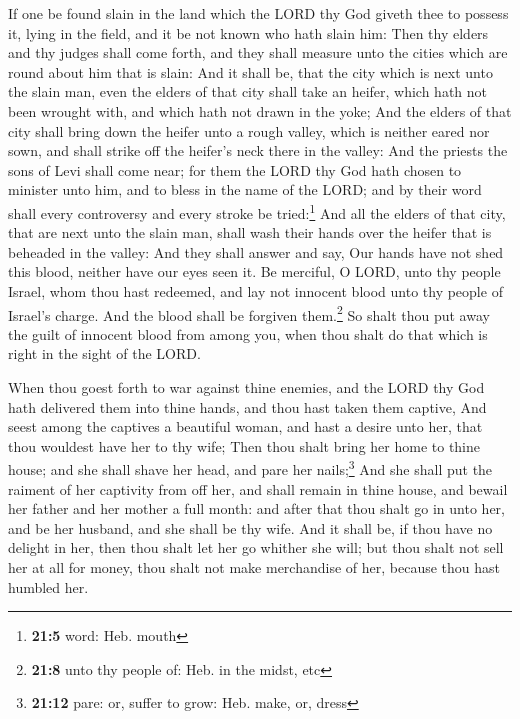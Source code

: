 If one be found slain in the land which the LORD thy God
giveth thee to possess it, lying in the field, and it be not known who
hath slain him:  Then thy elders and thy judges shall come
forth, and they shall measure unto the cities which are round about him
that is slain:  And it shall be, that the city which is
next unto the slain man, even the elders of that city shall take an
heifer, which hath not been wrought with, and which hath not drawn in
the yoke;  And the elders of that city shall bring down
the heifer unto a rough valley, which is neither eared nor sown, and
shall strike off the heifer's neck there in the valley: 
And the priests the sons of Levi shall come near; for them the LORD thy
God hath chosen to minister unto him, and to bless in the name of the
LORD; and by their word shall every controversy and every stroke be
tried:\footnote{\textbf{21:5} word: Heb. mouth}  And all
the elders of that city, that are next unto the slain man, shall wash
their hands over the heifer that is beheaded in the valley:
 And they shall answer and say, Our hands have not shed
this blood, neither have our eyes seen it.  Be merciful, O
LORD, unto thy people Israel, whom thou hast redeemed, and lay not
innocent blood unto thy people of Israel's charge. And the blood shall
be forgiven them.\footnote{\textbf{21:8} unto thy people of: Heb. in the
  midst, etc}  So shalt thou put away the guilt of
innocent blood from among you, when thou shalt do that which is right in
the sight of the LORD.

 When thou goest forth to war against thine enemies, and
the LORD thy God hath delivered them into thine hands, and thou hast
taken them captive,  And seest among the captives a
beautiful woman, and hast a desire unto her, that thou wouldest have her
to thy wife;  Then thou shalt bring her home to thine
house; and she shall shave her head, and pare her nails;\footnote{\textbf{21:12}
  pare: or, suffer to grow: Heb. make, or, dress}  And
she shall put the raiment of her captivity from off her, and shall
remain in thine house, and bewail her father and her mother a full
month: and after that thou shalt go in unto her, and be her husband, and
she shall be thy wife.  And it shall be, if thou have no
delight in her, then thou shalt let her go whither she will; but thou
shalt not sell her at all for money, thou shalt not make merchandise of
her, because thou hast humbled her.

